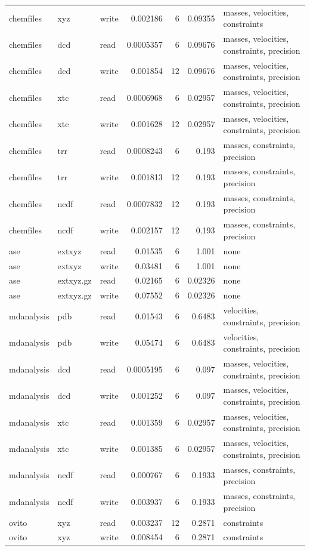 {\begin{longtable}{@{}lllrr r p{}@{}}
chemfiles & xyz & write & 0.002186 & 6 & 0.09355 & masses, velocities, constraints \\
chemfiles & dcd & read & 0.0005357 & 6 & 0.09676 & masses, velocities, constraints, precision \\
chemfiles & dcd & write & 0.001854 & 12 & 0.09676 & masses, velocities, constraints, precision \\
chemfiles & xtc & read & 0.0006968 & 6 & 0.02957 & masses, velocities, constraints, precision \\
chemfiles & xtc & write & 0.001628 & 12 & 0.02957 & masses, velocities, constraints, precision \\
chemfiles & trr & read & 0.0008243 & 6 & 0.193 & masses, constraints, precision \\
chemfiles & trr & write & 0.001813 & 12 & 0.193 & masses, constraints, precision \\
chemfiles & ncdf & read & 0.0007832 & 12 & 0.193 & masses, constraints, precision \\
chemfiles & ncdf & write & 0.002157 & 12 & 0.193 & masses, constraints, precision \\
ase & extxyz & read & 0.01535 & 6 & 1.001 & none \\
ase & extxyz & write & 0.03481 & 6 & 1.001 & none \\
ase & extxyz.gz & read & 0.02165 & 6 & 0.02326 & none \\
ase & extxyz.gz & write & 0.07552 & 6 & 0.02326 & none \\
mdanalysis & pdb & read & 0.01543 & 6 & 0.6483 & velocities, constraints, precision \\
mdanalysis & pdb & write & 0.05474 & 6 & 0.6483 & velocities, constraints, precision \\
mdanalysis & dcd & read & 0.0005195 & 6 & 0.097 & masses, velocities, constraints, precision \\
mdanalysis & dcd & write & 0.001252 & 6 & 0.097 & masses, velocities, constraints, precision \\
mdanalysis & xtc & read & 0.001359 & 6 & 0.02957 & masses, velocities, constraints, precision \\
mdanalysis & xtc & write & 0.001385 & 6 & 0.02957 & masses, velocities, constraints, precision \\
mdanalysis & ncdf & read & 0.000767 & 6 & 0.1933 & masses, constraints, precision \\
mdanalysis & ncdf & write & 0.003937 & 6 & 0.1933 & masses, constraints, precision \\
ovito & xyz & read & 0.003237 & 12 & 0.2871 & constraints \\
ovito & xyz & write & 0.008454 & 6 & 0.2871 & constraints \\
\bottomrule
\end{longtable}
}
